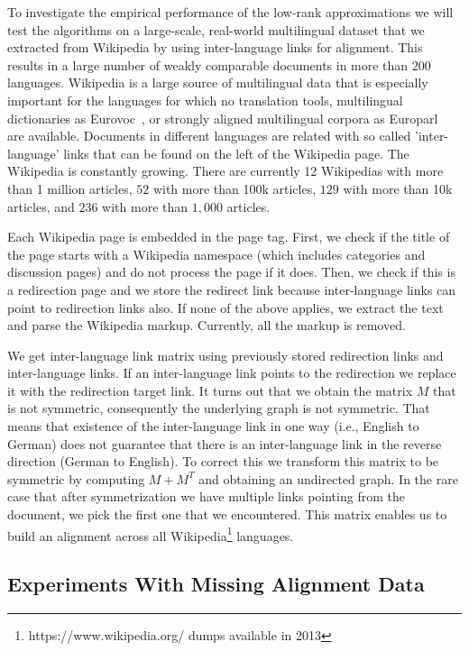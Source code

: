 To investigate the empirical performance of the low-rank approximations we will test the algorithms on a large-scale, real-world multilingual dataset that we extracted from Wikipedia by using inter-language links for alignment. This  results in a large number of weakly comparable documents in more than $200$ languages. Wikipedia is a large source of multilingual data that is especially important for the languages for which no translation tools, multilingual dictionaries as Eurovoc~\cite{eurovoc}, or strongly aligned multilingual corpora as Europarl~\cite{europarl} are available. Documents in different languages are related with so called 'inter-language' links that can be found on the left of the Wikipedia page. The Wikipedia is constantly growing. There are currently 12 Wikipedias with more than 1 million %
 articles, $52$ with more than 100k %
 articles, $129$ with more than 10k articles, and $236$ with more than $1,000$ articles.

Each Wikipedia page is embedded in the page tag. First, we check if the title of the page starts with a Wikipedia namespace (which includes categories and discussion pages) and do not process the page if it does. Then, we check if this is a redirection page and we store the redirect link because inter-language links can point to redirection links also. If none of the above applies, we extract the text and parse the Wikipedia markup. Currently, all the markup is removed.

We get inter-language link matrix using previously stored redirection links and inter-language links. If an inter-language link points to the redirection we replace it with the redirection target link. It turns out that we obtain the matrix $M$ that is not symmetric, consequently the underlying graph is not symmetric. That means that existence of the inter-language link in one way (i.e., English to German) does not guarantee that there is an inter-language link in the reverse direction (German to English). To correct this we transform this matrix to be symmetric by computing $M+M^T$ and obtaining an undirected graph. In the rare case that after symmetrization we have multiple links pointing from the document, we pick the first one that we encountered. This matrix enables us to build an alignment across all Wikipedia\footnote{https://www.wikipedia.org/ dumps available in 2013} languages.

\subsection{Experiments With Missing Alignment Data}\label{experiments:hubcca}

